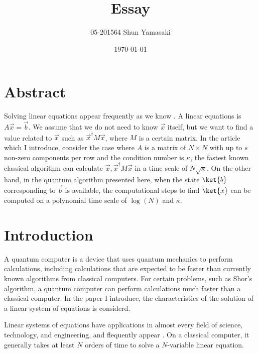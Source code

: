 \documentclass[b5paper,papersize,dvipdfmx,fleqn]{article}
\begin{document}
\title{Essay}
\author{05-201564 Shun Yamasaki}
\date{\today}
\maketitle

\section{Abstract}
Solving linear equations appear frequently as we know \cite{Harrow2009}. A linear equations is$A\vec{x} = \vec{b}.$ We assume that we do not need to know $\vec{x}$ itself, but we want to find a value related to $\vec{x}$ such as $\vec{x}^\dagger M \vec{x}$, where $M$ is a certain matrix. In the article which I introduce, consider the case where $A$ is a matrix of $N\times N$ with up to $s$ non-zero components per row and the condition number is $\kappa $, the fastest known classical algorithm can calculate $\vec{x}, \vec{x}^\dagger M\vec{x}$ in a time scale of $N\sqrt{\kappa }$.
On the other hand, in the quantum algorithm presented here, when the state $\ket{b}$ corresponding to $\vec{b}$ is available, the computational steps to find $\ket{x}$ can be computed on a polynomial time scale of $\log(N)$ and $\kappa $.

\section{Introduction}

A quantum computer is a device that uses quantum mechanics to perform calculations, including calculations that are expected to be faster than currently known algorithms from classical computers. For certain problems, such as Shor's algorithm, a quantum computer can perform calculations much faster than a classical computer. In the paper I introduce, the characteristics of the solution of a linear system of equations is considerd.


Linear systems of equations have applications in almost every field of science, technology, and engineering, and flequently appear \cite{Harrow2009}. On a classical computer, it generally takes at least $N$ orders of time to solve a $N$-variable linear equation.
\end{document}
